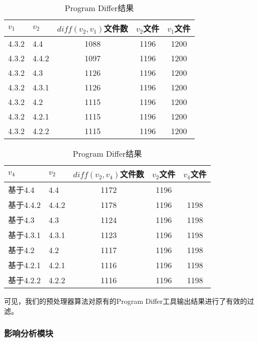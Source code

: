 \begin{table}[H]
	\caption{Program Differ结果}
	\label{data_differ_2}
	\centering
	\begin{tabular}{llccc}
		\toprule[1.5pt]
		{\heiti $v_1$} & {\heiti $v_2$} & {\heiti $diff(v_2,v_1)$文件数} & {\heiti $v_2$文件} & {\heiti $v_1$文件} \\\midrule[1pt]
		4.3.2 & 4.4	& 1088 & 1196 & 1200\\		
		4.3.2 & 4.4.2 & 1097 & 1196	& 1200	\\
		4.3.2 & 4.3 	 & 1126 & 1196	& 1200		\\
		4.3.2 & 4.3.1  & 1126 & 1196 & 1200			\\
		4.3.2 & 4.2 	& 1115 & 1196 & 1200		\\
		4.3.2 & 4.2.1 & 1115 & 1196 & 1200		\\
		4.3.2 & 4.2.2  & 1115 & 1196 & 1200		\\
		\bottomrule[1.5pt]
	\end{tabular}
\end{table}

\begin{table}[H]
	\caption{Program Differ结果}
	\label{data_differ_3}
	\centering
	\begin{tabular}{llccc}
		\toprule[1.5pt]
		{\heiti $v_4$} & {\heiti $v_2$} & {\heiti $diff(v_2,v_4)$文件数} & {\heiti $v_2$文件} & {\heiti $v_4$文件} \\\midrule[1pt]
		基于4.4 & 4.4	& 1172 & 1196 &	\\		
		基于4.4.2 & 4.4.2 & 1178 & 1196 & 1198		\\
		基于4.3 & 4.3 	 & 1124 & 1196	& 1198		\\
		基于4.3.1 & 4.3.1  & 1123 & 1196	& 1198		\\
		基于4.2 & 4.2 	& 1117 & 1196 & 1198		\\
		基于4.2.1 & 4.2.1 & 1116 & 1196	& 1198		\\
		基于4.2.2 & 4.2.2  & 1116 & 1196 & 1198		\\
		\bottomrule[1.5pt]
	\end{tabular}
\end{table}



可见，我们的预处理器算法对原有的Program Differ工具输出结果进行了有效的过滤。

\subsubsection{影响分析模块}

